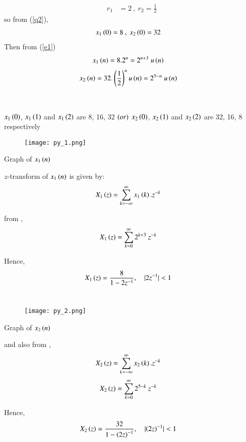 \documentclass[journal,12pt,twocolumn]{IEEEtran}
\theoremstyle{remark}
\begin{document}
\begin{align}
\label{q3}
r_1&=2\ ,\ r_2=\frac{1}{2}
\end{align}
so from (\ref{q2}),
\begin{align}x_1\brak{0}&=8\ ,\ x_2\brak{0}=32\end{align}
Then from (\ref{e1})
\begin{align}
    \label{a11}
    x_{1}\brak{n}&=8.2^{n}=2^{n+3}\ u\brak{n}
\end{align}
\begin{align}
    \label{a12}
    x_{2}\brak{n}=32.\left(\frac{1}{2}\right)^{n}u\brak{n}&=2^{5-n}\ u\brak{n}
\end{align}\\\\
$x_1\brak{0}$, $x_1\brak{1}$ and $x_1\brak{2}$ are 8, 16, 32 $\brak{or}$ $x_2\brak{0}$, $x_2\brak{1}$ and $x_2\brak{2}$ are 32, 16, 8 respectively
\begin{figure}[h]
    \centering
    \texttt{[image: py\_1.png]}
    \label{$2^{n+3}$}
\end{figure}

\begin{center}
    Graph of $x_1\brak{n}$
\end{center}
$z$-transform of $x_1\brak{n}$ is given by:\\
\begin{align}
\label{a13}
    X_1\brak{z}&=\sum_{k=-\infty}^{\infty} x_1\brak{k}.z^{-k}
\end{align}

from \brak{\ref{a11}},\\
\begin{align}X_1\brak{z}&=\sum_{k=0}^{\infty}2^{k+3}\ z^{-k}\end{align}

Hence,\\
\begin{align}
X_1\brak{z}&=\frac{8}{1-2z^{-1}},\quad |2z^{-1}|<1
\end{align}\\[10ex]

\begin{figure}[h]
    \centering
    \texttt{[image: py\_2.png]}
    \label{$2^{5-n}$}
\end{figure}

\begin{center}
    Graph of $x_2\brak{n}$
\end{center}

and also from \brak{\ref{a12}},\\
\begin{align}
    X_2\brak{z}&=\sum_{k=-\infty}^{\infty} x_2\brak{k}.z^{-k}
\end{align}
\begin{align}X_2\brak{z}&=\sum_{k=0}^{\infty} 2^{5-k}\ z^{-k}\end{align}

Hence,
\begin{align}X_2\brak{z}&=\frac{32}{1-{\brak{2z}^{-1}}},\quad |{\brak{2z}^{-1}}|<1 \end{align}
\end{document}
